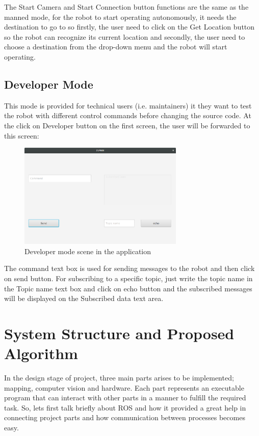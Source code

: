 \documentclass[12pt]{article}
\newcommand\blankpage{%
	\null
	\thispagestyle{empty}%
	\addtocounter{page}{-1}%
	\newpage}
\begin{document}
\noindent The Start Camera and Start Connection button functions are the same as the manned mode, for the robot to start operating autonomously, it needs the destination to go to so firstly, the user need to click on the Get Location button so the robot can recognize its current location and secondly, the user need to choose a destination from the drop-down menu and the robot will start operating.


\subsection{Developer Mode}
This mode is provided for technical users (i.e. maintainers) it they want to test the robot with different control commands before changing the source code. At the click on Developer button on the first screen, the user will be forwarded to this screen:

\begin{figure}[H]
	\centering
	\includegraphics[width =0.7\textwidth]{Fig/developer-mode.png}
	\caption{Developer mode scene in the application}
	\label{fig:develop-mode}
\end{figure}

\noindent The command text box is used for sending messages to the robot and then click on send button.
For subscribing to a specific topic, just write the topic name in the Topic name text box and click on
echo button and the subscribed messages will be displayed on the Subscribed data text area.

\afterpage{\blankpage}
\newpage

\section{System Structure and Proposed Algorithm}

In the design stage of project, three main parts arises to be implemented; mapping, computer vision and hardware. Each part represents an executable program that can interact with other parts in a manner to fulfill the required task. So, lets first talk briefly about ROS and how it provided a great help in connecting project parts and how communication between processes becomes easy.
\end{document}
